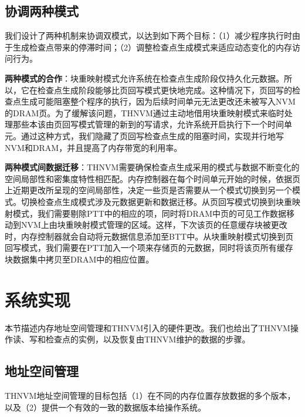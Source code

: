 \subsection{协调两种模式}
\label{subsec:coordination}

我们设计了两种机制来协调双模式，以达到如下两个目标：（1）减少程序执行时由于生成检查点带来的停滞时间；（2）调整检查点生成模式来适应动态变化的内存访问行为。

\textbf{两种模式的合作}：块重映射模式允许系统在检查点生成阶段仅持久化元数据。所以，它在检查点生成阶段能够比页回写模式更快地完成。这种情况下，页回写的检查点生成可能阻塞整个程序的执行，因为后续时间单元无法更改还未被写入NVM的DRAM页。为了缓解该问题，THNVM通过主动地借用块重映射模式来临时处理那些本该由页回写模式管理的新到的写请求，允许系统开启执行下一个时间单元。通过这种方式，我们隐藏了页回写检查点生成的阻塞时间，实现并行地写NVM和DRAM，并且提高了内存带宽的利用率。

\textbf{两种模式间数据迁移}：THNVM需要确保检查点生成采用的模式与数据不断变化的空间局部性和密集度特性相匹配。内存控制器在每个时间单元开始的时候，依据页上近期更改所呈现的空间局部性，决定一些页是否需要从一个模式切换到另一个模式。切换检查点生成模式涉及元数据更新和数据迁移。从页回写模式切换到块重映射模式，我们需要剔除PTT中的相应的项，同时将DRAM中页的可见工作数据移动到NVM上由块重映射模式管理的区域。这样，下次该页的任意缓存块被更改时，内存控制器就会自动将元数据信息添加至BTT中。从块重映射模式切换到页回写模式，我们需要在PTT加入一个项来存储页的元数据，同时将该页所有缓存块数据集中拷贝至DRAM中的相应位置。

\section{系统实现}
\label{sec:implementation}

本节描述内存地址空间管理和THNVM引入的硬件更改。我们也给出了THNVM操作读、写和检查点的实例，以及恢复由THNVM维护的数据的步骤。

\subsection{地址空间管理}
\label{subsec:thnvm-space}

THNVM地址空间管理的目标包括（1）在不同的内存位置存放数据的多个版本，以及（2）提供一个有效的一致的数据版本给操作系统。

